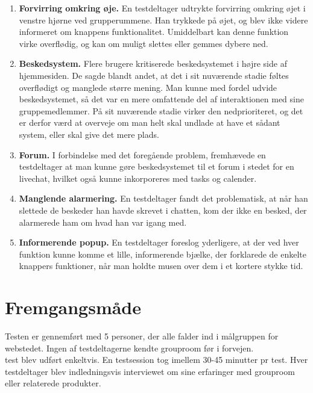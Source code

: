 \documentclass[12pt]{article}
\begin{document}
\begin{enumerate}
  \item \textbf{Forvirring omkring øje.} En testdeltager udtrykte forvirring omkring øjet i venstre hjørne ved grupperummene. Han trykkede på øjet, og blev ikke videre informeret om knappens funktionalitet. Umiddelbart kan denne funktion virke overflødig, og kan om muligt slettes eller gemmes dybere ned.

  \item \textbf{Beskedsystem.} Flere brugere kritiserede beskedsystemet i højre side af hjemmesiden. De sagde blandt andet, at det i sit nuværende stadie føltes overflødigt og manglede større mening. Man kunne med fordel udvide beskedsystemet, så det var en mere omfattende del af interaktionen med sine gruppemedlemmer. På sit nuværende stadie virker den nedprioriteret, og det er derfor værd at overveje om man helt skal undlade at have et sådant system, eller skal give det mere plads.

  \item \textbf{Forum.} I forbindelse med det foregående problem, fremhævede en testdeltager at man kunne gøre beskedsystemet til et forum i stedet for en livechat, hvilket også kunne inkorporeres med tasks og calender.
  
  \item \textbf{Manglende alarmering.} En testdeltager fandt det problematisk, at når han slettede de beskeder han havde skrevet i chatten, kom der ikke en besked, der alarmerede ham om hvad han var igang med.
  
  \item \textbf{Informerende popup.} En testdeltager foreslog yderligere, at der ved hver funktion kunne komme et lille, informerende bjælke, der forklarede de enkelte knappers funktioner, når man holdte musen over dem i et kortere stykke tid.
\end{enumerate}

\section{Fremgangsmåde}
Testen er gennemført med 5 personer, der alle falder ind i målgruppen for webstedet. Ingen af testdeltagerne kendte grouproom før i forvejen.\\

\noindentAlle test blev udført enkeltvis. En testsession tog imellem 30-45 minutter pr test. Hver testdeltager blev indledningsvis interviewet om sine erfaringer med grouproom eller relaterede produkter. \\
\end{document}
